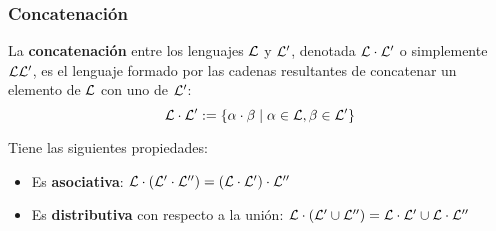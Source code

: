 \subsubsection{Concatenación}

La \textbf{concatenación} entre los lenguajes $\mathcal{L}$ y $\mathcal{L}'$, denotada $\mathcal{L} \cdot \mathcal{L}'$ o simplemente $\mathcal{L}\mathcal{L}'$, es el lenguaje formado por las cadenas resultantes de concatenar un elemento de $\mathcal{L}$ con uno de $\mathcal{L}'$:
$$\mathcal{L} \cdot \mathcal{L}' := \{\alpha \cdot \beta \mid \alpha \in \mathcal{L}, \beta \in \mathcal{L}'\}$$

Tiene las siguientes propiedades:
\begin{itemize}
    \item Es \textbf{asociativa}: $\mathcal{L} \cdot (\mathcal{L}' \cdot \mathcal{L}'') = (\mathcal{L} \cdot \mathcal{L}') \cdot \mathcal{L}''$
    \item Es \textbf{distributiva} con respecto a la unión: $\mathcal{L} \cdot (\mathcal{L}' \cup \mathcal{L}'') = \mathcal{L} \cdot \mathcal{L}' \cup \mathcal{L} \cdot \mathcal{L}''$
\end{itemize}
